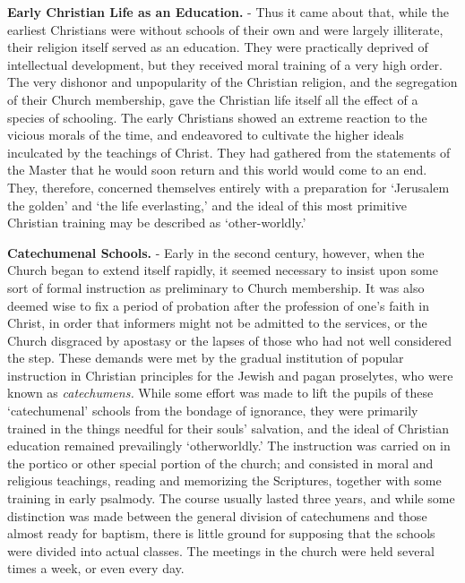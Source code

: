 \documentclass[
]{book}
\begin{document}
\textbf{Early Christian Life as an Education.} - Thus it came about that, while the earliest Christians were without schools of their own and were largely illiterate, their religion itself served as an education. They were practically deprived of intellectual development, but they received moral training of a very high order. The very dishonor and unpopularity of the Christian religion, and the segregation of their Church membership, gave the Christian life itself all the effect of a species of schooling. The early Christians showed an extreme reaction to the vicious morals of the time, and endeavored to cultivate the higher ideals inculcated by the teachings of Christ. They had gathered from the statements of the Master that he would soon return and this world would come to an end. They, therefore, concerned themselves entirely with a preparation for `Jerusalem the golden' and `the life everlasting,' and the ideal of this most primitive Christian training may be described as `other-worldly.'

\textbf{Catechumenal Schools.} - Early in the second century, however, when the Church began to extend itself rapidly, it seemed necessary to insist upon some sort of formal instruction as preliminary to Church membership. It was also deemed wise to fix a period of probation after the profession of one's faith in Christ, in order that informers might not be admitted to the services, or the Church disgraced by apostasy or the lapses of those who had not well considered the step. These demands were met by the gradual institution of popular instruction in Christian principles for the Jewish and pagan proselytes, who were known as \emph{catechumens.} While some effort was made to lift the pupils of these `catechumenal' schools from the bondage of ignorance, they were primarily trained in the things needful for their souls' salvation, and the ideal of Christian education remained prevailingly `otherworldly.' The instruction was carried on in the portico or other special portion of the church; and consisted in moral and religious teachings, reading and memorizing the Scriptures, together with some training in early psalmody. The course usually lasted three years, and while some distinction was made between the general division of catechumens and those almost ready for baptism, there is little ground for supposing that the schools were divided into actual classes. The meetings in the church were held several times a week, or even every day.
\end{document}
